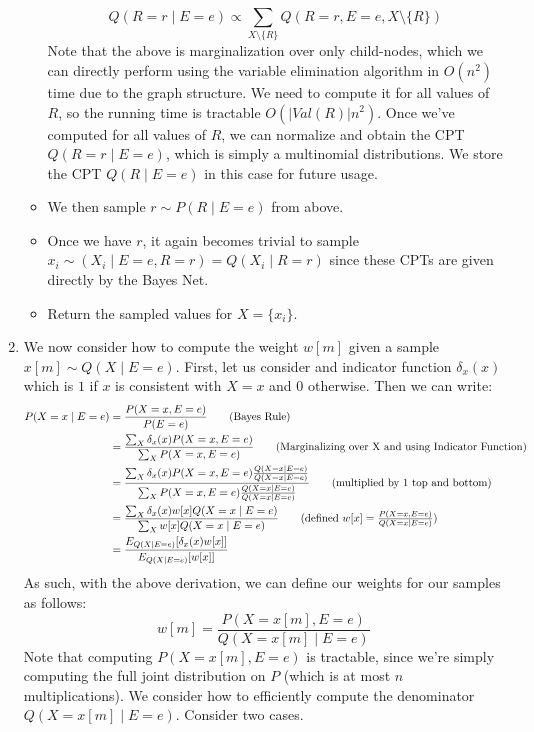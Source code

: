 \documentclass[12pt]{article}
\begin{document}
\begin{enumerate}[label=(\alph*)]
\begin{itemize}
			$$
				Q(R = r \mid E=e) \propto \sum_{X \setminus \{R\}} Q(R=r, E=e, X \setminus \{R\})
			$$
			Note that the above is marginalization over only child-nodes, which we can directly perform using the variable elimination algorithm in $O(n^2)$ time due to the graph structure. We need to compute it for all values of $R$, so the running time is tractable $O(|Val(R)|n^2)$. Once we've computed for all values of $R$, we can normalize and obtain the CPT $Q(R = r \mid E = e)$, which is simply a multinomial distributions. We store the CPT $Q(R \mid E = e)$ in this case for future usage.
			\item We then sample $r \sim P(R \mid E=e)$ from above.
			\item Once we have $r$, it again becomes trivial to sample $x_i \sim (X_i \mid E=e, R=r) = Q(X_i \mid R= r)$ since these CPTs are given directly by the Bayes Net. 
			\item Return the sampled values for $X = \{x_i\}$.
		\end{itemize}
	\item We now consider how to compute the weight $w[m]$ given a sample $x[m] \sim Q(X\mid E = e)$. First, let us consider and indicator function $\delta_x(x)$ which is $1$ if $x$ is consistent with $X = x$ and $0$ otherwise. Then we can write:
		\begin{align*}
			P(X = x \mid E = e) &= \frac{P(X = x, E=e)}{P(E=e)} \tag{Bayes Rule} \\
			&= \frac{\sum_{X} \delta_x(x)P(X = x, E=e)}{\sum_{X} P(X= x, E=e)} \tag{Marginalizing over X and using Indicator Function} \\
			&= \frac{\sum_{X} \delta_x(x)P(X = x, E=e)\frac{Q(X=x\mid E =e)}{Q(X = x \mid E = e)}}{\sum_{X} P(X= x, E=e)\frac{Q(X=x\mid E =e)}{Q(X = x \mid E = e)}} \tag{multiplied by $1$ top and bottom} \\
			&= \frac{\sum_{X} \delta_x(x)w[x]Q(X = x \mid E = e)}{\sum_{X} w[x]Q(X = x \mid E = e)} \tag{defined $w[x] = \frac{P(X = x, E =e)}{Q(X = x \mid E = e)}$}\\
			&= \frac{E_{Q(X \mid E = e)}[\delta_x(x)w[x]]}{E_{Q(X \mid E = e)}[w[x]]}
		\end{align*}
		As such, with the above derivation, we can define our weights for our samples as follows:
		$$
			w[m] = \frac{P(X = x[m], E = e)}{Q(X = x[m] \mid E = e)}
		$$
		Note that computing $P(X = x[m], E = e)$ is tractable, since we're simply computing the full joint distribution on $P$ (which is at most $n$ multiplications). We consider how to efficiently compute the denominator $Q(X = x[m] \mid E = e)$. Consider two cases.

\end{enumerate}
\end{document}
